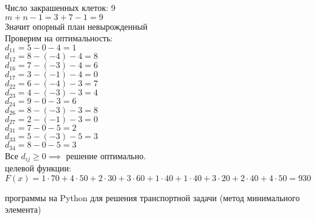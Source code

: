 \begin{flushleft}
Число закрашенных клеток: 9\\
$m + n - 1 = 3 + 7 - 1 = 9$\\
Значит опорный план невырожденный\\
Проверим на оптимальность:\\
$d_{11} = 5 - 0 - 4 = 1$\\
$d_{12} = 8 - (-4) - 4 = 8$\\
$d_{16} = 7 - (-3) - 4 = 6$\\
$d_{17} = 3 - (-1) - 4 = 0$\\
$d_{22} = 6 - (-4) - 3 = 7$\\
$d_{23} = 4 - (-3) - 3 = 4$\\
$d_{24} = 9 - 0 - 3 = 6$\\
$d_{26} = 8 - (-3) - 3 = 8$\\
$d_{27} = 2 - (-1) - 3 = 0$\\
$d_{31} = 7 - 0 - 5 = 2$\\
$d_{33} = 5 - (-3) - 5 = 3$\\
$d_{34} = 8 - 0 - 5 = 3$\\
Все $d_{ij} \ge 0 \implies$ решение оптимально.\\
{ целевой функции:\\
$F(x) = 1 \cdot 70 + 4 \cdot 50 + 2 \cdot 30 + 3 \cdot 60 + 1 \cdot 40 + 1 \cdot 40 + 3 \cdot 20 + 2 \cdot 40 + 4 \cdot 50 = 930$}
\end{flushleft}

\newpage

{ программы на Python для решения транспортной задачи (метод минимального элемента)}

